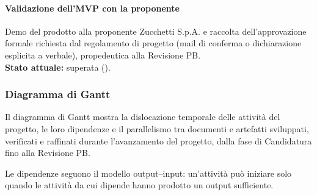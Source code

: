\paragraph{Validazione dell'MVP con la proponente}
Demo del prodotto alla proponente Zucchetti S.p.A. e raccolta
dell'approvazione formale richiesta dal regolamento di progetto (mail di
conferma o dichiarazione esplicita a verbale), propedeutica alla Revisione
PB.\\
\textbf{Stato attuale:} superata ().

\subsubsection{Diagramma di Gantt}

Il diagramma di Gantt mostra la dislocazione temporale delle attività del
progetto, le loro dipendenze e il parallelismo tra documenti e artefatti
sviluppati, verificati e raffinati durante l'avanzamento del progetto, dalla
fase di Candidatura fino alla Revisione PB.

Le dipendenze seguono il modello output--input: un'attività può iniziare solo
quando le attività da cui dipende hanno prodotto un output sufficiente.

